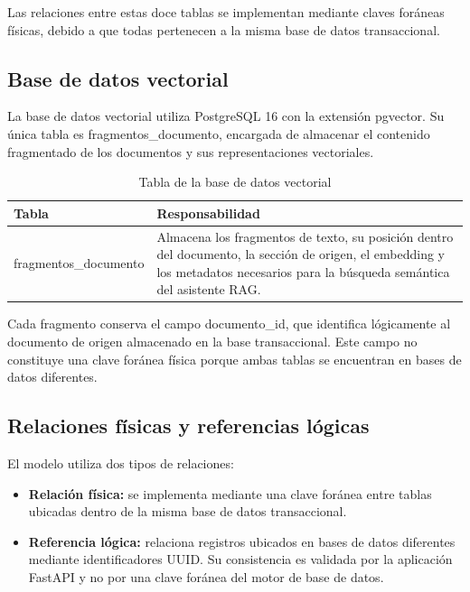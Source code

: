 Las relaciones entre estas doce tablas se implementan mediante claves
foráneas físicas, debido a que todas pertenecen a la misma base de datos
transaccional.



\subsection{Base de datos vectorial}

La base de datos vectorial utiliza PostgreSQL 16 con la extensión pgvector.
Su única tabla es fragmentos\_documento, encargada de almacenar
el contenido fragmentado de los documentos y sus representaciones
vectoriales.

\begin{table}[H]
\centering
\caption{Tabla de la base de datos vectorial}
\label{tab:tabla-vectorial}
\renewcommand{\arraystretch}{1.3}
\begin{tabularx}{\textwidth}{
    >{\raggedright\arraybackslash}p{4cm}
    >{\raggedright\arraybackslash}X
}
\toprule
\textbf{Tabla} & \textbf{Responsabilidad} \\
\midrule

fragmentos\_documento
&
Almacena los fragmentos de texto, su posición dentro del documento,
la sección de origen, el embedding y los metadatos necesarios para
la búsqueda semántica del asistente RAG.
\\

\bottomrule
\end{tabularx}
\end{table}

Cada fragmento conserva el campo documento\_id, que identifica
lógicamente al documento de origen almacenado en la base transaccional.
Este campo no constituye una clave foránea física porque ambas tablas se
encuentran en bases de datos diferentes.



\subsection{Relaciones físicas y referencias lógicas}

El modelo utiliza dos tipos de relaciones:

\begin{itemize}
    \item \textbf{Relación física:} se implementa mediante una clave
    foránea entre tablas ubicadas dentro de la misma base de datos
    transaccional.

    \item \textbf{Referencia lógica:} relaciona registros ubicados en
    bases de datos diferentes mediante identificadores UUID. Su
    consistencia es validada por la aplicación FastAPI y no por una
    clave foránea del motor de base de datos.
\end{itemize}

